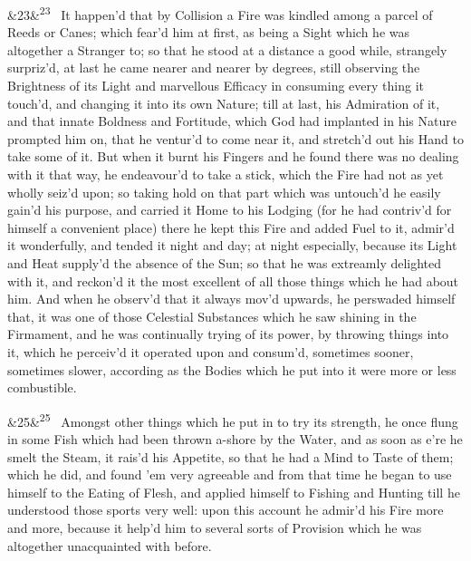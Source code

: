 \documentclass[12pt]{article}
\newcommand{\para}[1][]{\par\noindent\ifx&#1&\else\textsuperscript{\footnotesize #1}~\fi}
\begin{document}
\para[23] It happen'd that by Collision a Fire was kindled among a parcel of Reeds or Canes; which fear'd him at first, as being a Sight which he was altogether a Stranger to; so that he stood at a distance a good while, strangely surpriz'd, at last he came nearer and nearer by degrees, still observing the Brightness of its Light and marvellous Efficacy in consuming every thing it touch'd, and changing it into its own Nature; till at last, his Admiration of it, and that innate Boldness and Fortitude, which God had implanted in his Nature prompted him on, that he ventur'd to come near it, and stretch'd out his Hand to take some of it. But when it burnt his Fingers and he found there was no dealing with it that way, he endeavour'd to take a stick, which the Fire had not as yet wholly seiz'd upon; so taking hold on that part which was untouch'd he easily gain'd his purpose, and carried it Home to his Lodging (for he had contriv'd for himself a convenient place) there he kept this Fire and added Fuel to it, admir'd it wonderfully, and tended it night and day; at night especially, because its Light and Heat supply'd the absence of the Sun; so that he was extreamly delighted with it, and reckon'd it the most excellent of all those things which he had about him. And when he observ'd that it always mov'd upwards, he perswaded himself that, it was one of those Celestial Substances which he saw shining in the Firmament, and he was continually trying of its power, by throwing things into it, which he perceiv'd it operated upon and consum'd, sometimes sooner, sometimes slower, according as the Bodies which he put into it were more or less combustible.

\para[25] Amongst other things which he put in to try its strength, he once flung in some Fish which had been thrown a-shore by the Water, and as soon as e're he smelt the Steam, it rais'd his Appetite, so that he had a Mind to Taste of them; which he did, and found 'em very agreeable and from that time he began to use himself to the Eating of Flesh, and applied himself to Fishing and Hunting till he understood those sports very well: upon this account he admir'd his Fire more and more, because it help'd him to several sorts of Provision which he was altogether unacquainted with before.
\end{document}
